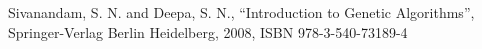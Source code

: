 \documentclass[conference]{IEEEtran}
\begin{document}
\begin{thebibliography}{00}

Sivanandam, S. N. and Deepa, S. N., ``Introduction to Genetic Algorithms'',
	Springer-Verlag Berlin Heidelberg, 2008, ISBN 978-3-540-73189-4
%
%
%
%
%
%
%
%
%
%

\end{thebibliography}
\end{document}
